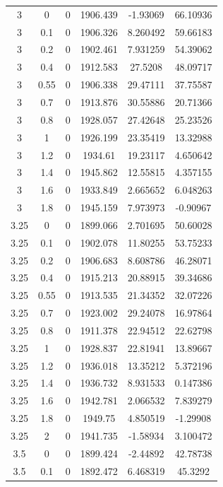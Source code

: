 \begin{longtable}{|c|c|c|c|c|c|}
	3     & 0     & 0     & 1906.439 & -1.93069 & 66.10936 \\
	3     & 0.1   & 0     & 1906.326 & 8.260492 & 59.66183 \\
	3     & 0.2   & 0     & 1902.461 & 7.931259 & 54.39062 \\
	3     & 0.4   & 0     & 1912.583 & 27.5208 & 48.09717 \\
	3     & 0.55  & 0     & 1906.338 & 29.47111 & 37.75587 \\
	3     & 0.7   & 0     & 1913.876 & 30.55886 & 20.71366 \\
	3     & 0.8   & 0     & 1928.057 & 27.42648 & 25.23526 \\
	3     & 1     & 0     & 1926.199 & 23.35419 & 13.32988 \\
	3     & 1.2   & 0     & 1934.61 & 19.23117 & 4.650642 \\
	3     & 1.4   & 0     & 1945.862 & 12.55815 & 4.357155 \\
	3     & 1.6   & 0     & 1933.849 & 2.665652 & 6.048263 \\
	3     & 1.8   & 0     & 1945.159 & 7.973973 & -0.90967 \\
	3.25  & 0     & 0     & 1899.066 & 2.701695 & 50.60028 \\
	3.25  & 0.1   & 0     & 1902.078 & 11.80255 & 53.75233 \\
	3.25  & 0.2   & 0     & 1906.683 & 8.608786 & 46.28071 \\
	3.25  & 0.4   & 0     & 1915.213 & 20.88915 & 39.34686 \\
	3.25  & 0.55  & 0     & 1913.535 & 21.34352 & 32.07226 \\
	3.25  & 0.7   & 0     & 1923.002 & 29.24078 & 16.97864 \\
	3.25  & 0.8   & 0     & 1911.378 & 22.94512 & 22.62798 \\
	3.25  & 1     & 0     & 1928.837 & 22.81941 & 13.89667 \\
	3.25  & 1.2   & 0     & 1936.018 & 13.35212 & 5.372196 \\
	3.25  & 1.4   & 0     & 1936.732 & 8.931533 & 0.147386 \\
	3.25  & 1.6   & 0     & 1942.781 & 2.066532 & 7.839279 \\
	3.25  & 1.8   & 0     & 1949.75 & 4.850519 & -1.29908 \\
	3.25  & 2     & 0     & 1941.735 & -1.58934 & 3.100472 \\
	3.5   & 0     & 0     & 1899.424 & -2.44892 & 42.78738 \\
	3.5   & 0.1   & 0     & 1892.472 & 6.468319 & 45.3292 \\

\end{longtable}
